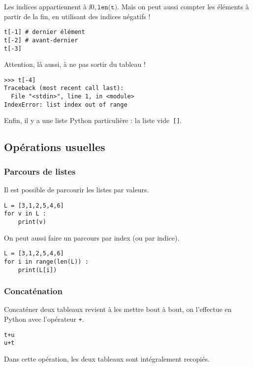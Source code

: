 Les indices appartiennent à $\ii{0,\texttt{len(t)}}$.
Mais on peut aussi compter les éléments à partir de la fin, en utilisant des indices négatifs !
\begin{lstlisting}
t[-1] # dernier élément
t[-2] # avant-dernier
t[-3]
\end{lstlisting}

Attention, là aussi, à ne pas sortir du tableau !

\begin{lstlisting}
>>> t[-4]
Traceback (most recent call last):
  File "<stdin>", line 1, in <module>
IndexError: list index out of range
\end{lstlisting}

Enfin, il y a une liste Python particulière : la liste vide~\texttt{[]}.



\subsection{Opérations usuelles}

\subsubsection{Parcours de listes}

\begin{minipage}[c]{.47\linewidth}
Il est possible de parcourir les listes par valeurs. 
\begin{lstlisting}
L = [3,1,2,5,4,6]
for v in L : 
    print(v)
\end{lstlisting}
\end{minipage}
\hfill
\begin{minipage}[c]{.47\linewidth}
On peut aussi faire un parcours par index (ou par indice).
\begin{lstlisting}
L = [3,1,2,5,4,6]
for i in range(len(L)) : 
    print(L[i])
\end{lstlisting}
\end{minipage}


\subsubsection{Concaténation}
Concaténer deux tableaux revient à les mettre bout à bout, on l'effectue en Python avec 
l'opérateur \texttt{+}.
\begin{lstlisting}
t+u
u+t
\end{lstlisting}
Dans cette opération, les deux tableaux sont intégralement recopiés. 

